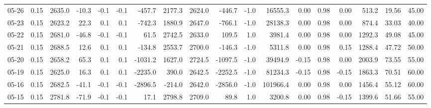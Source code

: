 \begin{threeparttable}
{\begin{tabular}{lrrrrrrrrrrrrrrrrr}
  05-26 &     0.15 & 2635.0 &             -10.3 &              -0.1 &               -0.1 &             -457.7 &  2177.3 & 2624.0 &     -446.7 &                     -1.0 &             16555.3 &       0.00 &      0.98 &           0.00 &            513.2 &           19.56 &                  45.00 \\
  05-23 &     0.15 & 2623.2 &              22.3 &               0.1 &                0.1 &             -742.3 &  1880.9 & 2647.0 &     -766.1 &                     -1.0 &             28138.3 &       0.00 &      0.98 &           0.00 &            874.4 &           33.03 &                  40.00 \\
  05-22 &     0.15 & 2681.0 &             -46.8 &              -0.1 &               -0.1 &               61.5 &  2742.5 & 2633.0 &      109.5 &                      1.0 &              3981.4 &       0.00 &      0.98 &           0.00 &           1292.3 &           49.08 &                  45.00 \\
  05-21 &     0.15 & 2688.5 &              12.6 &               0.1 &                0.1 &             -134.8 &  2553.7 & 2700.0 &     -146.3 &                     -1.0 &              5311.8 &       0.00 &      0.98 &           0.15 &           1288.4 &           47.72 &                  50.00 \\
  05-20 &     0.15 & 2658.2 &              65.3 &               0.1 &                0.1 &            -1031.2 &  1627.0 & 2724.5 &    -1097.5 &                     -1.0 &             39494.9 &      -0.15 &      0.98 &           0.00 &           2003.9 &           73.55 &                  55.00 \\
  05-19 &     0.15 & 2625.0 &              16.3 &               0.1 &                0.1 &            -2235.0 &   390.0 & 2642.5 &    -2252.5 &                     -1.0 &             81234.3 &      -0.15 &      0.98 &          -0.15 &           1863.3 &           70.51 &                  60.00 \\
  05-16 &     0.15 & 2682.5 &             -41.1 &              -0.1 &               -0.1 &            -2896.5 &  -214.0 & 2642.0 &    -2856.0 &                     -1.0 &            101966.4 &       0.00 &      0.98 &           0.00 &           1456.4 &           55.12 &                  60.00 \\
  05-15 &     0.15 & 2781.8 &             -71.9 &              -0.1 &               -0.1 &               17.1 &  2798.8 & 2709.0 &       89.8 &                      1.0 &              3200.8 &       0.00 &      0.98 &          -0.15 &           1399.6 &           51.66 &                  55.00 \\

\end{tabular}}
\end{threeparttable}
